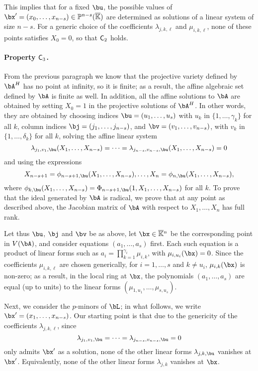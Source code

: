 \documentclass[12pt]{article}
\begin{document}
This implies that for a fixed $\bu$, the possible values of $\bx'=(x_0,\dots,x_{n-s}) \in \P^{n-s}(\KKbar)$ are
determined as solutions of a linear system of size $n-s$. For a
generic choice of the coefficients $\lambda_{j,k,\ell}$ and
$\mu_{i,k,\ell}$, none of these points satisfies $X_0=0$, so that
$\mathsf{C}_2$ holds.

\paragraph{Property $\mathsf{C}_3$.} From the previous paragraph we know that
the projective variety defined by $\bA^\mH$ has no point at infinity,
so it is finite; as a result, the affine algebraic set defined by
$\bA$ is finite as well. In addition, all the affine solutions to
$\bA$ are obtained by setting $X_0=1$ in the projective solutions of
$\bA^\mH$. In other words, they are obtained by choosing indices
$\bu=(u_1,\dots,u_s)$ with $u_k$ in $\{1,\dots,\gamma_k\}$ for all $k$,
column indices $\bj=(j_1,\dots,j_{n-s})$, and
$\bv=(v_1,\dots,v_{n-s})$, with $v_k$ in $\{1,\dots,\delta_k\}$
for all $k$, solving the affine linear system
$$\lambda_{j_1,v_1,\bu}(X_1,\dots,X_{n-s})=\cdots=\lambda_{j_{n-s},v_{n-s},\bu}(X_1,\dots,X_{n-s})=0$$ 
and using the expressions
$$X_{n-s+1}=\phi_{n-s+1,\bu}(X_1,\dots,X_{n-s}),\dots,X_{n}=\phi_{n,\bu}(X_1,\dots,X_{n-s}),$$
where $\phi_{k,\bu}(X_1,\dots,X_{n-s})=\Phi_{n-s+1,\bu}(1,X_1,\dots,X_{n-s})$
for all $k$.
To prove that the ideal generated by $\bA$ is radical, we prove that
at any point as described above, the Jacobian matrix of $\bA$ with
respect to $X_1,\dots,X_n$ has full rank.

Let thus $\bu$, $\bj$ and $\bv$ be as above, let $\bx \in \KKbar{}^n$
be the corresponding point in $V(\bA)$, and consider equations
$(a_1,\dots,a_s)$ first. Each such equation is a product of linear forms
such as $a_i=\prod_{k=1}^{\gamma_i} \mu_{i,k}$, with $\mu_{i,u_i}(\bx)=0$.
Since the coefficients $\mu_{i,k,\ell}$ are chosen generically, for
$i=1,\dots,s$ and $k \ne u_i$, $\mu_{i,k}(\bx)$ is non-zero; as a
result, in the local ring at $\bx$, the polynomials $(a_1,\dots,a_s)$
are equal (up to units) to the linear forms
$(\mu_{1,u_1},\dots,\mu_{s,u_s})$.

Next, we consider the $p$-minors of $\bL$; in what follows, we 
write $\bx'=(x_1,\dots,x_{n-s})$. Our starting point is that due to 
the genericity of the coefficients $\lambda_{j,k,\ell}$, since 
$$\lambda_{j_1,v_1,\bu}=\cdots=\lambda_{j_{n-s},v_{n-s},\bu}=0$$
only admits $\bx'$ as a solution,
none of the other linear forms $\lambda_{j,k,\bu}$ vanishes at $\bx'$.
Equivalently, none of the other linear forms $\lambda_{j,k}$ vanishes at $\bx$.
\end{document}
